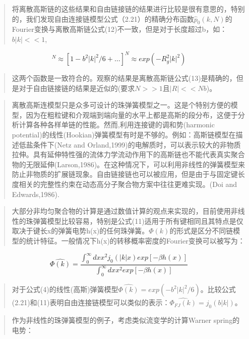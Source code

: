 			\begin{quotation}
				将离散高斯链的这些结果和自由链接链的结果进行比较是很有意思的，特别的，我们发现自由连接链模型公式（2.21）的精确分布函数$\hat{p}_{0}(k,N)$的Fourier变换与离散高斯链公式(12)不一致，但是对于长度超过b，如：$b|k|<<1$,
			\end{quotation}
			\begin{equation}
			[j_{0}(b|k|)]^N\approx [1-b^2|k|^2/6+\dots]^N\approx exp(-R_{g}^2|k|^2)
			\end{equation}
			\begin{quotation}
				这两个函数是一致符合的。观察的结果是离散高斯链公式(13)是精确的，但是对于自由链接链的结果是近似的(要求$N>>1$且$|R|<<Nb$)。
			\end{quotation}
			\begin{quotation}
				离散高斯连模型只是众多可设计的珠弹簧模型之一。这是个特别方便的模型，因为在粗粒键和介观端到端向量的水平上都是高斯的段分布，这便于分析计算各种各样单链的性能。然而,利用连接键的调和势(harmonic potential)的线性(Hookian)弹簧模型有时是不够的。例如：高斯链模型在描述低盐条件下(Netz and Orland,1999)的电解质时，可以表示较大的非物质拉伸。具有延伸特性强的流体力学流动作用下的高斯链也不能代表真实聚合物的无限延伸(Larson,1986)。在这种情况下，可以利用非线性的弹簧模型来防止非物质的扩展链现象。自由链接链也可以被应用，但是由于与固定键长度相关的完整性约束在动态高分子聚合物方案中往往更难实现。(Doi and Edwards,1986).
			\end{quotation}
			\begin{quotation}
				大部分非均匀聚合物的计算是通过数值计算的观点来实现的，目前使用非线性的珠弹簧模型比较容易，特别是公式(11)适用于所有键相同且其特点是仅取决于键长x的弹簧电势h(x)的任何珠弹簧。$\varPhi(k)
				$的形式是区分不同链模型的统计特征。一般情况下h(x)的转移概率密度的Fourier变换可以被写为：
			\end{quotation}
			\begin{equation}
			\hat{\varPhi(k)}=\frac{\int_{0}^{\infty} dx x^2j_{0}(|k|x)exp[-\beta h(x)]}{\int_{0}^{\infty} dx x^2exp[-\beta h(x)]} 
			\end{equation}
			\begin{quotation}
				对于公式(4)的线性(高斯)弹簧模型$\hat{\varPhi(k)}=exp(-b^2|k|^2/6)$。比较公式(2.21)和(11)表明自由连接链模型可以类似的表示：$\hat{\varPhi_{FJ}(k)}=j_{0}(b|k|)$。
			\end{quotation}
			\begin{quotation}
				作为非线性的珠弹簧模型的例子，考虑类似流变学的计算Warner spring的电势：
			\end{quotation}
